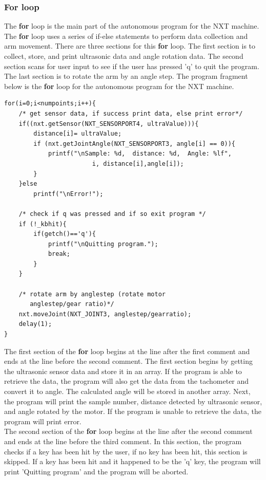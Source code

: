 \documentclass[11pt]{article}
\begin{document}
\subsubsection*{For loop}
The {\bf for} loop is the main part of the autonomous program for the NXT machine.
The {\bf for} loop uses a series of if-else statements to perform data collection 
and arm movement. There are three sections for this {\bf for} loop. The first 
section is to collect, store, and print ultrasonic data and angle rotation data. 
The second section scans for user input to see if the user has pressed 'q' to quit 
the program. The last section is to rotate the arm by an angle step. The program 
fragment below is the {\bf for} loop for the autonomous program for the NXT machine.
\begin{lstlisting}
for(i=0;i<numpoints;i++){
    /* get sensor data, if success print data, else print error*/
    if((nxt.getSensor(NXT_SENSORPORT4, ultraValue))){
        distance[i]= ultraValue;
        if (nxt.getJointAngle(NXT_SENSORPORT3, angle[i] == 0)){
            printf("\nSample: %d,  distance: %d,  Angle: %lf",
                        i, distance[i],angle[i]);
        }
    }else	
        printf("\nError!");

    /* check if q was pressed and if so exit program */
    if (!_kbhit){
        if(getch()=='q'){
            printf("\nQuitting program.");
            break;
        }
    }		

    /* rotate arm by anglestep (rotate motor 
       anglestep/gear ratio)*/
    nxt.moveJoint(NXT_JOINT3, anglestep/gearratio);
    delay(1);
}
\end{lstlisting}
The first section of the {\bf for} loop begins at the line after the first 
comment and ends at the line before the second comment. The first section begins 
by getting the ultrasonic sensor data and store it in an array. If the program 
is able to retrieve the data, the program will also get the data from the tachometer 
and convert it to angle. The calculated angle will be stored in another array. Next, 
the program will print the sample number, distance detected by ultrasonic sensor, 
and angle rotated by the motor. If the program is unable to retrieve the data, 
the program will print error.\\ 

The second section of the {\bf for} loop begins at the line after the second comment 
and ends at the line before the third comment. In this section, the program checks 
if a key has been hit by the user, if no key has been hit, this section is skipped. 
If a key has been hit and it happened to be the 'q' key, the program will print 
'Quitting program' and the program will be aborted.\\
\end{document}
